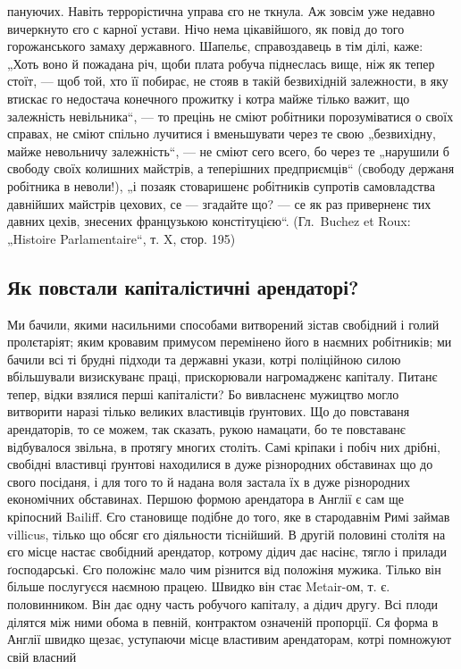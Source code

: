 \parcont{}
пануючих. Навіть террорістична управа єго не ткнула. Аж
зовсім уже недавно вичеркнуто єго с карної устави. Нічо
нема цікавійшого, як повід до того горожанського замаху
державного. Шапельє, справоздавець в тім ділі, каже: „Хоть
воно й пожадана річ, щоби плата робуча піднеслась вище,
ніж як тепер стоїт, — щоб той, хто її побирає, не стояв
в такій безвихідній залежности, в яку втискає го недостача
конечного прожитку і котра майже тілько важит, що залежність
невільника“, — то прецінь не сміют робітники
порозуміватися о своїх справах, не сміют спільно лучитися
і вменьшувати через те свою „безвихідну, майже невольничу
залежність“, — не сміют сего всего, бо через те „нарушили б
свободу своїх колишних майстрів, а теперішних
предприємців“ (свободу держаня робітника в неволи!), „і позаяк
стоваришенє робітників супротів самовладства давнійших
майстрів цехових, се — згадайте що? — се як раз приверненє
тих давних цехів, знесених французькою констітуцією“.
(Гл.~Buchez et Roux: „Histoire Parlamentaire“, т. X,
стор. 195)

\subsection{Як повстали капіталістичні арендаторі?}

Ми бачили, якими насильними способами витворений
зістав свобідний і голий пролєтаріят; яким кровавим примусом
перемінено його в наємних робітників; ми бачили всі
ті брудні підходи та державні укази, котрі поліційною силою
вбільшували визискуванє праці, прискорювали нагромадженє
капіталу. Питанє тепер, відки взялися перші капіталісти?
Бо вивласненє
мужицтво
могло витворити наразі тілько великих властивців ґрунтових.
Що до повставаня арендаторів, то се можем, так сказать, рукою
намацати, бо те повставанє відбувалося звільна, в протягу
многих століть. Самі кріпаки і побіч них дрібні, свобідні
властивці ґрунтові находилися в дуже різнородних обставинах
що до свого посіданя, і для того то й надана воля
застала їх в дуже різнородних економічних обставинах.
Першою формою арендатора в Англії є сам ще кріпосний
Bailiff. Єго становище подібне до того, яке в стародавнім
Римі займав villicus, тілько що обсяг єго діяльности тіснійший.
В другій половині  столітя на єго місце настає свобідний
арендатор, котрому дідич дає насінє, тягло і прилади
ґосподарські. Єго положінє мало чим різнится від
положіня мужика. Тілько він більше послугуєся наємною
працею. Швидко він стає Metair-ом, т. є. половинником. Він
дає одну часть робучого капіталу, а дідич другу. Всі плоди
ділятся між ними обома в певній, контрактом означеній
пропорції. Ся форма в Англії швидко щезає, уступаючи
місце властивим арендаторам, котрі помножуют свій власний
\parbreak{}
